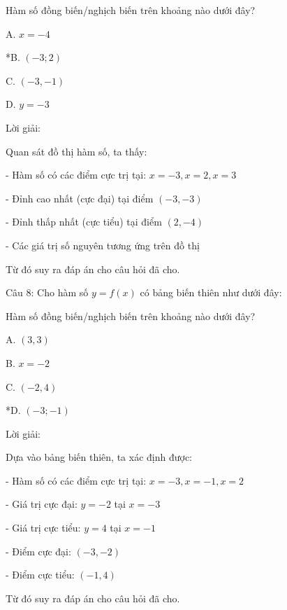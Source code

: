 \documentclass[a4paper,12pt]{article}
\begin{document}
Hàm số đồng biến/nghịch biến trên khoảng nào dưới đây?

A. \(x=-4\)

*B. \((-3;2)\)

C. \((-3,-1)\)

D. \(y=-3\)

Lời giải:


            Quan sát đồ thị hàm số, ta thấy:

- Hàm số có các điểm cực trị tại: \(x = -3, x = 2, x = 3\)

- Đỉnh cao nhất (cực đại) tại điểm \((-3, -3)\)

- Đỉnh thấp nhất (cực tiểu) tại điểm \((2, -4)\)

- Các giá trị số nguyên tương ứng trên đồ thị

Từ đó suy ra đáp án cho câu hỏi đã cho.




Câu 8: Cho hàm số \(y=f(x)\) có bảng biến thiên như dưới đây:




Hàm số đồng biến/nghịch biến trên khoảng nào dưới đây?

A. \((3,3)\)

B. \(x=-2\)

C. \((-2,4)\)

*D. \((-3;-1)\)

Lời giải:


Dựa vào bảng biến thiên, ta xác định được:

- Hàm số có các điểm cực trị tại: \(x = -3, x = -1, x = 2\)

- Giá trị cực đại: \(y = -2\) tại \(x = -3\)

- Giá trị cực tiểu: \(y = 4\) tại \(x = -1\)

- Điểm cực đại: \((-3, -2)\)

- Điểm cực tiểu: \((-1, 4)\)

Từ đó suy ra đáp án cho câu hỏi đã cho.
\end{document}
